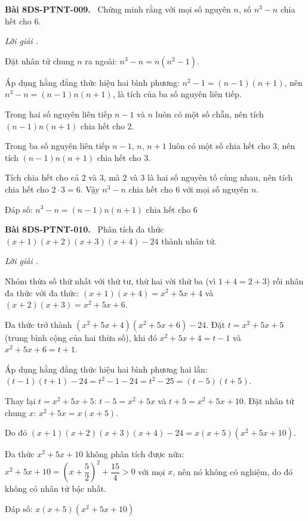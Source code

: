 \documentclass[12pt,a4paper]{article}
\newenvironment{problem}[1][]{\par\medskip\noindent\textbf{Bài #1.}\ }{\par}
\newenvironment{solution}[1][]{\par\noindent\textit{Lời giải #1.}\par}{\par}
\begin{document}
\begin{problem}[8DS-PTNT-009]
Chứng minh rằng với mọi số nguyên $n$, số $n^3 - n$ chia hết cho $6$.

\begin{solution}
Đặt nhân tử chung $n$ ra ngoài: $n^3 - n = n(n^2 - 1)$.

Áp dụng hằng đẳng thức hiệu hai bình phương: $n^2 - 1 = (n - 1)(n + 1)$, nên $n^3 - n = (n - 1)n(n + 1)$, là tích của ba số nguyên liên tiếp.

Trong hai số nguyên liên tiếp $n - 1$ và $n$ luôn có một số chẵn, nên tích $(n - 1)n(n + 1)$ chia hết cho $2$.

Trong ba số nguyên liên tiếp $n - 1$, $n$, $n + 1$ luôn có một số chia hết cho $3$, nên tích $(n - 1)n(n + 1)$ chia hết cho $3$.

Tích chia hết cho cả $2$ và $3$, mà $2$ và $3$ là hai số nguyên tố cùng nhau, nên tích chia hết cho $2 \cdot 3 = 6$. Vậy $n^3 - n$ chia hết cho $6$ với mọi số nguyên $n$.

Đáp số: $\boxed{n^3 - n = (n - 1)n(n + 1) \text{ chia hết cho } 6}$
\end{solution}
\end{problem}

\begin{problem}[8DS-PTNT-010]
Phân tích đa thức $(x + 1)(x + 2)(x + 3)(x + 4) - 24$ thành nhân tử.

\begin{solution}
Nhóm thừa số thứ nhất với thứ tư, thứ hai với thứ ba (vì $1 + 4 = 2 + 3$) rồi nhân đa thức với đa thức: $(x + 1)(x + 4) = x^2 + 5x + 4$ và $(x + 2)(x + 3) = x^2 + 5x + 6$.

Đa thức trở thành $(x^2 + 5x + 4)(x^2 + 5x + 6) - 24$. Đặt $t = x^2 + 5x + 5$ (trung bình cộng của hai thừa số), khi đó $x^2 + 5x + 4 = t - 1$ và $x^2 + 5x + 6 = t + 1$.

Áp dụng hằng đẳng thức hiệu hai bình phương hai lần: $(t - 1)(t + 1) - 24 = t^2 - 1 - 24 = t^2 - 25 = (t - 5)(t + 5)$.

Thay lại $t = x^2 + 5x + 5$: $t - 5 = x^2 + 5x$ và $t + 5 = x^2 + 5x + 10$. Đặt nhân tử chung $x$: $x^2 + 5x = x(x + 5)$.

Do đó $(x + 1)(x + 2)(x + 3)(x + 4) - 24 = x(x + 5)(x^2 + 5x + 10)$.

Đa thức $x^2 + 5x + 10$ không phân tích được nữa: $x^2 + 5x + 10 = \left(x + \dfrac{5}{2}\right)^2 + \dfrac{15}{4} > 0$ với mọi $x$, nên nó không có nghiệm, do đó không có nhân tử bậc nhất.

Đáp số: $\boxed{x(x + 5)(x^2 + 5x + 10)}$
\end{solution}
\end{problem}
\end{document}
